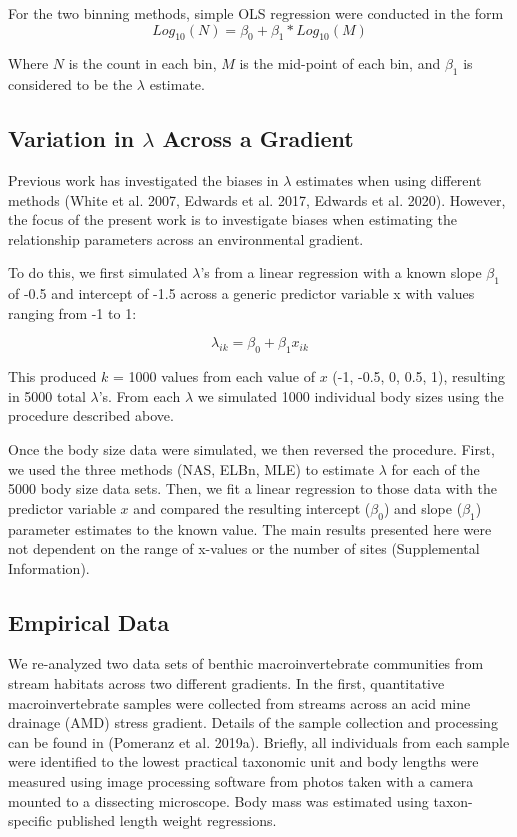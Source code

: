 \documentclass[
]{article}
\begin{document}
For the two binning methods, simple OLS regression were conducted in the
form \[Log_{10}(N) = \beta_0 + \beta_1 * Log_{10}(M)\]

Where \(N\) is the count in each bin, \(M\) is the mid-point of each
bin, and \(\beta_{1}\) is considered to be the \(\lambda\) estimate.

\hypertarget{variation-in-lambda-across-a-gradient}{%
\subsection{\texorpdfstring{Variation in \(\lambda\) Across a
Gradient}{Variation in \textbackslash lambda Across a Gradient}}\label{variation-in-lambda-across-a-gradient}}

Previous work has investigated the biases in \(\lambda\) estimates when
using different methods (White et al. 2007, Edwards et al. 2017, Edwards
et al. 2020). However, the focus of the present work is to investigate
biases when estimating the relationship parameters across an
environmental gradient.

To do this, we first simulated \(\lambda\)'s from a linear regression
with a known slope \(\beta_{1}\) of -0.5 and intercept of -1.5 across a
generic predictor variable x with values ranging from -1 to 1:

\[\lambda_{ik} = \beta_{0} + \beta_{1}x_{ik}\]

This produced \(k\) = 1000 values from each value of \(x\) (-1, -0.5, 0,
0.5, 1), resulting in 5000 total \(\lambda\)'s. From each \(\lambda\) we
simulated 1000 individual body sizes using the procedure described
above.

Once the body size data were simulated, we then reversed the procedure.
First, we used the three methods (NAS, ELBn, MLE) to estimate
\(\lambda\) for each of the 5000 body size data sets. Then, we fit a
linear regression to those data with the predictor variable \(x\) and
compared the resulting intercept (\(\beta_{0}\)) and slope
(\(\beta_{1}\)) parameter estimates to the known value. The main results
presented here were not dependent on the range of x-values or the number
of sites (Supplemental Information).

\hypertarget{empirical-data}{%
\subsection{Empirical Data}\label{empirical-data}}

We re-analyzed two data sets of benthic macroinvertebrate communities
from stream habitats across two different gradients. In the first,
quantitative macroinvertebrate samples were collected from streams
across an acid mine drainage (AMD) stress gradient. Details of the
sample collection and processing can be found in (Pomeranz et al.
2019a). Briefly, all individuals from each sample were identified to the
lowest practical taxonomic unit and body lengths were measured using
image processing software from photos taken with a camera mounted to a
dissecting microscope. Body mass was estimated using taxon-specific
published length weight regressions.
\end{document}
